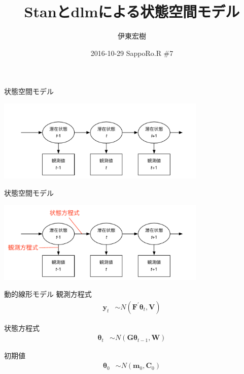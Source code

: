 \documentclass[dvipdfmx,12pt]{beamer}
\begin{document}
\title{Stanとdlmによる状態空間モデル}
\author{伊東宏樹}
\date{2016-10-29 SappoRo.R \#7}
\maketitle

\begin{frame}{状態空間モデル}

\begin{center}
\includegraphics[width=10cm]{ssm}
\end{center}

\end{frame}

\begin{frame}{状態空間モデル}

\begin{center}
\includegraphics[width=10cm]{ssm2}
\end{center}

\end{frame}

\begin{frame}{動的線形モデル}
  観測方程式
  \begin{align*}
    \boldsymbol{y}_t &\sim N(\boldsymbol{F}^{\prime} \boldsymbol{\theta}_t, \boldsymbol{V})
  \end{align*}

  状態方程式
  \begin{align*}
    \boldsymbol{\theta}_t &\sim N(\boldsymbol{G} \boldsymbol{\theta}_{t-1}, \boldsymbol{W})
  \end{align*}

  初期値
  \begin{align*}
    \boldsymbol{\theta}_0 &\sim N(\boldsymbol{m}_0, \boldsymbol{C}_0)
  \end{align*}

\end{frame}
\end{document}
